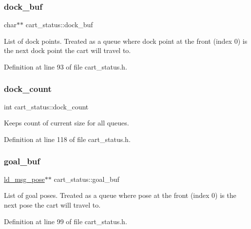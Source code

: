 \subsubsection{\texorpdfstring{dock\+\_\+buf}{dock\_buf}}
{\footnotesize\ttfamily char$\ast$$\ast$ cart\+\_\+status\+::dock\+\_\+buf\hspace{0.3cm}{\ttfamily [private]}}

List of dock points. Treated as a queue where dock point at the front (index 0) is the next dock point the cart will travel to. 

Definition at line 93 of file cart\+\_\+status.\+h.

\mbox{\label{classcart__status_a37e9ce8c21a0d76250866a6fd7550024}} 
\subsubsection{\texorpdfstring{dock\+\_\+count}{dock\_count}}
{\footnotesize\ttfamily int cart\+\_\+status\+::dock\+\_\+count\hspace{0.3cm}{\ttfamily [private]}}

Keeps count of current size for all queues. 

Definition at line 118 of file cart\+\_\+status.\+h.

\mbox{\label{classcart__status_a4912ff0b77258f77f4f7c118ad8345c7}} 
\subsubsection{\texorpdfstring{goal\+\_\+buf}{goal\_buf}}
{\footnotesize\ttfamily \mbox{\hyperlink{structld__msg__pose}{ld\+\_\+msg\+\_\+pose}}$\ast$$\ast$ cart\+\_\+status\+::goal\+\_\+buf\hspace{0.3cm}{\ttfamily [private]}}

List of goal poses. Treated as a queue where pose at the front (index 0) is the next pose the cart will travel to. 

Definition at line 99 of file cart\+\_\+status.\+h.

\mbox{\label{classcart__status_ab22c188f57ded9039c5bf65b56d14967}} 
